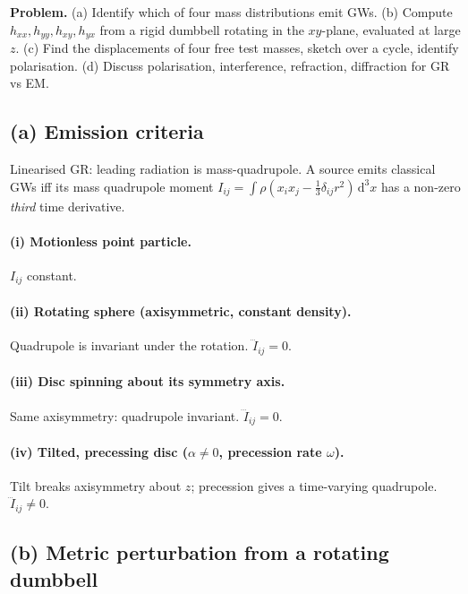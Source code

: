 \documentclass[11pt]{article}
\newcommand{\de}{\mathrm{d}}
\begin{document}
\textbf{Problem.} (a) Identify which of four mass distributions emit GWs. (b) Compute $h_{xx},h_{yy},h_{xy},h_{yx}$ from a rigid dumbbell rotating in the $xy$-plane, evaluated at large $z$. (c) Find the displacements of four free test masses, sketch over a cycle, identify polarisation. (d) Discuss polarisation, interference, refraction, diffraction for GR vs EM.

\subsection*{(a) Emission criteria}

Linearised GR: leading radiation is mass-quadrupole. A source emits classical GWs iff its mass quadrupole moment $I_{ij}=\int\rho(x_ix_j-\tfrac13\delta_{ij}r^2)\,\de^3x$ has a non-zero \emph{third} time derivative.

\paragraph{(i) Motionless point particle.}
$I_{ij}$ constant. 

\paragraph{(ii) Rotating sphere (axisymmetric, constant density).}
Quadrupole is invariant under the rotation. $\dddot{I}_{ij}=0$. 

\paragraph{(iii) Disc spinning about its symmetry axis.}
Same axisymmetry: quadrupole invariant. $\dddot{I}_{ij}=0$. 

\paragraph{(iv) Tilted, precessing disc ($\alpha\neq 0$, precession rate $\omega$).}
Tilt breaks axisymmetry about $z$; precession gives a time-varying quadrupole. $\dddot{I}_{ij}\neq 0$. 

\subsection*{(b) Metric perturbation from a rotating dumbbell}
\end{document}
